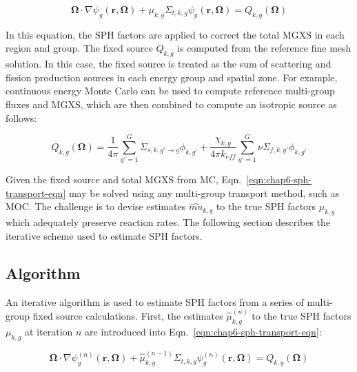 \begin{dmath}
\label{eqn:chap6-sph-transport-eqn}
\mathbf{\Omega} \cdot \nabla \psi_{g}(\mathbf{r},\mathbf{\Omega}) + \mu_{k,g}\Sigma_{t,k,g}\psi_{g}(\mathbf{r},\mathbf{\Omega}) = Q_{k,g}(\mathbf{\Omega})
\end{dmath}

\noindent In this equation, the \ac{SPH} factors are applied to correct the total \ac{MGXS} in each region and group. The fixed source $Q_{k,g}$ is computed from the reference fine mesh solution. In this case,  the fixed source is treated as the sum of scattering and fission production sources in each energy group and spatial zone. For example, continuous energy Monte Carlo can be used to compute reference multi-group fluxes and \ac{MGXS}, which are then combined to compute an isotropic source as follows:

\begin{dmath}
\label{eqn:chap6-sph-source}
Q_{k,g}(\mathbf{\Omega}) = \frac{1}{4\pi} \sum_{g'=1}^{G} \Sigma_{s,k,g' \rightarrow g}\phi_{k,g'} + \frac{\chi_{k,g}}{4\pi k_{eff}}\sum_{g'=1}^{G} \nu\Sigma_{f,k,g'}\phi_{k,g'}
\end{dmath}

\noindent Given the fixed source and total \ac{MGXS} from \ac{MC}, Eqn.~\ref{eqn:chap6-sph-transport-eqn} may be solved using any multi-group transport method, such as \ac{MOC}. The challenge is to devise estimates $\hat{mu}_{k,g}$ to the true \ac{SPH} factors $\mu_{k,g}$ which adequately preserve reaction rates. The following section describes the iterative scheme used to estimate \ac{SPH} factors.

\subsection{Algorithm}
\label{subsec:chap6-sph-algorithm}

An iterative algorithm is used to estimate \ac{SPH} factors from a series of multi-group fixed source calculations. First, the estimates $\hat{\mu}_{k,g}^{(n)}$ to the true \ac{SPH} factors $\mu_{k,g}$ at iteration $n$ are introduced into Eqn.~\ref{eqn:chap6-sph-transport-eqn}:

\begin{dmath}
\label{eqn:chap6-sph-transport-eqn-iterate}
\mathbf{\Omega} \cdot \nabla \psi_{g}^{(n)}(\mathbf{r},\mathbf{\Omega}) + \hat{\mu}_{k,g}^{(n-1)}\Sigma_{t,k,g}\psi_{g}^{(n)}(\mathbf{r},\mathbf{\Omega}) = Q_{k,g}(\mathbf{\Omega})
\end{dmath}

